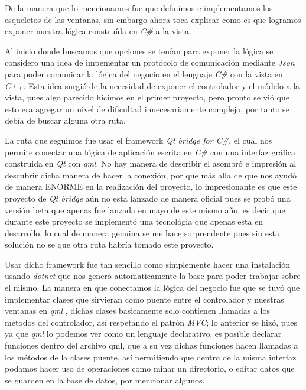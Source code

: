 \documentclass[10pt,letterpaper]{report}
\begin{document}
    \vspace{0.2cm}

    \noindent De la manera que lo mencionamos fue que definimos e implementamos los esqueletos de las ventanas, sin embargo ahora toca explicar como es que logramos exponer nuestra lógica construída en \textit{C\#} a la vista.

\noindent Al inicio donde buscamos que opciones se tenían para exponer la lógica se considero una idea de impementar un protócolo de comunicación mediante \textit{Json} para poder comunicar la lógica del negocio en el lenguaje \textit{C\#} con la vista en \textit{C++}. Esta idea surgió de la necesidad de exponer el controlador y el módelo a la vista, pues algo parecido hicimos en el primer proyecto, pero pronto se vió que esto era agregar un nivel de dificultad innecesariamente complejo, por tanto se debía de buscar alguna otra ruta. 

\vspace{0.2cm}

\noindent La ruta que seguimos fue usar el framework \textit{Qt bridge for C\#}, el cuál nos permite conectar una lógica de aplicación escrita en \textit{C\#} con una interfaz gráfica construida en \textit{Qt} con \textit{qml}. No hay manera de describir el asombró e impresión al descubrir dicha manera de hacer la conexión, por que más alla de que nos ayudó de manera ENORME en la realización del proyecto, lo impresionante es que este proyecto de \textit{Qt bridge} aún no esta lanzado de manera oficial pues se probó una versión beta que apenas fue lanzada en mayo de este mismo año, es decir que durante este proyecto se implementó una tecnológia que apenas esta en desarrollo, lo cual de manera genuina se me hace sorprendente pues sin esta solución no se que otra ruta habría tomado este proyecto.

\vspace{0.2cm}

\noindent Usar dicho framework fue tan sencillo como simplemente hacer una instalación usando \textit{dotnet} que nos generó automaticamente la base para poder trabajar sobre el mismo.
\noindent La manera en que conectamos la lógica del negocio fue que se tuvó que implementar clases que sirvieran como puente entre el controlador y nuestras ventanas en \textit{qml} , dichas clases basicamente solo contienen llamadas a los métodos del controlador, así respetando el patrón \textit{MVC}; lo anterior se hizó, pues ya que \textit{qml} lo podemos ver como un lenguaje declarativo, es posible declarar funciones dentro del archivo qml, que a su vez dichas funciones hacen llamadas a los métodos de la clases puente, así permitiendo que dentro de la misma interfaz podamos hacer uso de operaciones como minar un directorio, o editar datos que se guarden en la base de datos, por mencionar algunos.
\end{document}
